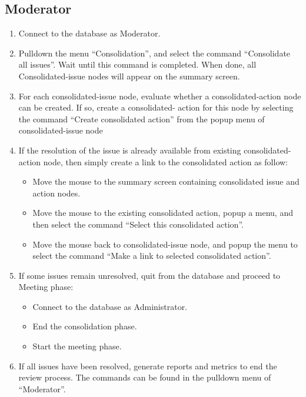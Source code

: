 \subsection*{Moderator}
\begin{enumerate}
\item Connect to the database as Moderator.
\item Pulldown the menu ``Consolidation'', and select the command
``Consolidate all issues''. Wait until this command is completed.
When done, all Consolidated-issue nodes will appear on the summary
screen. 
\item For each consolidated-issue node, evaluate whether a
consolidated-action node can be created. If so, create a consolidated-
action for this node by selecting the command ``Create consolidated
action'' from the popup menu of consolidated-issue node
\item If the resolution of the issue is already available from
existing consolidated-action node, then simply create a link to the
consolidated action as follow:
\begin {itemize}
\item Move the mouse to the summary screen containing consolidated
issue and action nodes.
\item Move the mouse to the existing consolidated action, popup a menu,
and then select the command ``Select this consolidated action''.
\item Move the mouse back to consolidated-issue node, and popup the
menu to select the command ``Make a link to selected consolidated
action''. 
\end{itemize}
\item If some issues remain unresolved, quit from the database and
proceed to Meeting phase:
  \begin{itemize}
    \item Connect to the database as Administrator.
    \item End the consolidation phase.
    \item Start the meeting phase.
   \end {itemize}
\item If all issues have been resolved, generate reports and metrics
to end the review process. The commands can be found in the 
pulldown menu of ``Moderator''.

\end{enumerate}


